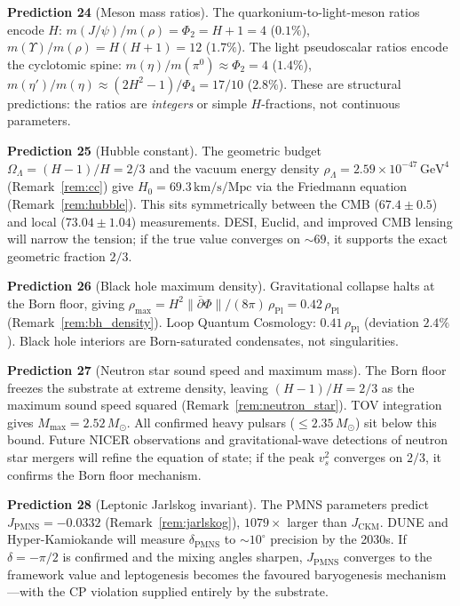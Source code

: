 \documentclass[11pt,a4paper]{article}
\theoremstyle{definition}
\theoremstyle{remark}
\begin{document}
\textbf{Prediction 24} (Meson mass ratios). The quarkonium-to-light-meson ratios encode $H$: $m(J/\psi)/m(\rho)=\Phi_2=H+1=4$ ($0.1\%$), $m(\Upsilon)/m(\rho)=H(H+1)=12$ ($1.7\%$). The light pseudoscalar ratios encode the cyclotomic spine: $m(\eta)/m(\pi^0)\approx\Phi_2=4$ ($1.4\%$), $m(\eta')/m(\eta)\approx(2H^2-1)/\Phi_4=17/10$ ($2.8\%$). These are structural predictions: the ratios are \emph{integers} or simple $H$-fractions, not continuous parameters.

\textbf{Prediction 25} (Hubble constant). The geometric budget $\Omega_\Lambda=(H-1)/H=2/3$ and the vacuum energy density $\rho_\Lambda=2.59\times 10^{-47}\,\mathrm{GeV}^4$ (Remark~\ref{rem:cc}) give $H_0=69.3\,\mathrm{km/s/Mpc}$ via the Friedmann equation (Remark~\ref{rem:hubble}). This sits symmetrically between the CMB ($67.4\pm 0.5$) and local ($73.04\pm 1.04$) measurements. DESI, Euclid, and improved CMB lensing will narrow the tension; if the true value converges on $\sim\!69$, it supports the exact geometric fraction $2/3$.

\textbf{Prediction 26} (Black hole maximum density). Gravitational collapse halts at the Born floor, giving $\rho_{\max}=H^2\|\bar\partial\Phi\|/(8\pi)\,\rho_{\mathrm{Pl}}=0.42\,\rho_{\mathrm{Pl}}$ (Remark~\ref{rem:bh_density}). Loop Quantum Cosmology: $0.41\,\rho_{\mathrm{Pl}}$ (deviation $2.4\%$). Black hole interiors are Born-saturated condensates, not singularities.

\textbf{Prediction 27} (Neutron star sound speed and maximum mass). The Born floor freezes the substrate at extreme density, leaving $(H-1)/H=2/3$ as the maximum sound speed squared (Remark~\ref{rem:neutron_star}). TOV integration gives $M_{\max}=2.52\,M_\odot$. All confirmed heavy pulsars ($\leq 2.35\,M_\odot$) sit below this bound. Future NICER observations and gravitational-wave detections of neutron star mergers will refine the equation of state; if the peak $v_s^2$ converges on $2/3$, it confirms the Born floor mechanism.

\textbf{Prediction 28} (Leptonic Jarlskog invariant). The PMNS parameters predict $J_{\mathrm{PMNS}}=-0.0332$ (Remark~\ref{rem:jarlskog}), $1079\times$ larger than $J_{\mathrm{CKM}}$. DUNE and Hyper-Kamiokande will measure $\delta_{\mathrm{PMNS}}$ to $\sim\!10^\circ$ precision by the 2030s. If $\delta=-\pi/2$ is confirmed and the mixing angles sharpen, $J_{\mathrm{PMNS}}$ converges to the framework value and leptogenesis becomes the favoured baryogenesis mechanism---with the CP violation supplied entirely by the substrate.
\end{document}
